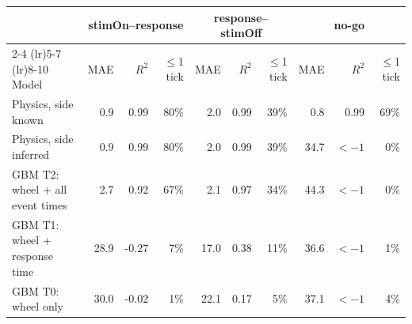 \begin{tabular}{lrrrrrrrrr}
\toprule
 & \multicolumn{3}{c}{stimOn--response} & \multicolumn{3}{c}{response--stimOff} & \multicolumn{3}{c}{no-go} \\
\cmidrule(lr){2-4} \cmidrule(lr){5-7} \cmidrule(lr){8-10}
Model & MAE & $R^2$ & $\le$1 tick & MAE & $R^2$ & $\le$1 tick & MAE & $R^2$ & $\le$1 tick \\
\midrule
Physics, side known & 0.9 & 0.99 & 80\% & 2.0 & 0.99 & 39\% & 0.8 & 0.99 & 69\% \\
Physics, side inferred & 0.9 & 0.99 & 80\% & 2.0 & 0.99 & 39\% & 34.7 & $<{-1}$ & 0\% \\
GBM T2: wheel + all event times & 2.7 & 0.92 & 67\% & 2.1 & 0.97 & 34\% & 44.3 & $<{-1}$ & 0\% \\
GBM T1: wheel + response time & 28.9 & -0.27 & 7\% & 17.0 & 0.38 & 11\% & 36.6 & $<{-1}$ & 1\% \\
GBM T0: wheel only & 30.0 & -0.02 & 1\% & 22.1 & 0.17 & 5\% & 37.1 & $<{-1}$ & 4\% \\
\bottomrule
\end{tabular}
